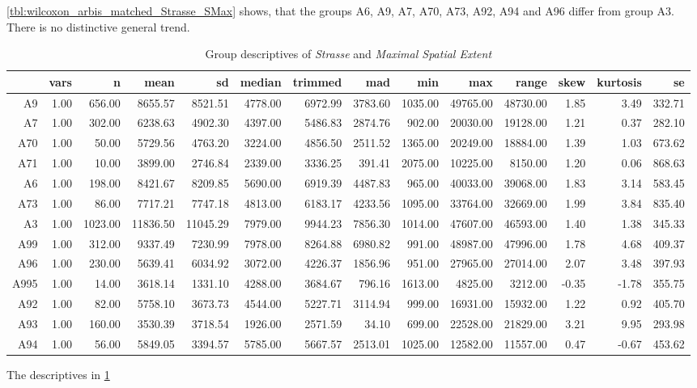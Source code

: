 \cref{tbl:wilcoxon_arbis_matched_Strasse_SMax} shows, that the groups A6, A9, A7, A70, A73, A92, A94 and A96 differ from group A3. There is no distinctive general trend.
\begin{table}[ht!]
	\tiny
	\centering
	\begin{tabular}{rrrrrrrrrrrrrr}
		\hline
		& vars & n & mean & sd & median & trimmed & mad & min & max & range & skew & kurtosis & se \\ 
		\hline
		A9   & 1.00 & 656.00 & 8655.57 & 8521.51 & 4778.00 & 6972.99 & 3783.60 & 1035.00 & 49765.00 & 48730.00 & 1.85 & 3.49 & 332.71 \\ 
		A7   & 1.00 & 302.00 & 6238.63 & 4902.30 & 4397.00 & 5486.83 & 2874.76 & 902.00 & 20030.00 & 19128.00 & 1.21 & 0.37 & 282.10 \\ 
		A70  & 1.00 & 50.00 & 5729.56 & 4763.20 & 3224.00 & 4856.50 & 2511.52 & 1365.00 & 20249.00 & 18884.00 & 1.39 & 1.03 & 673.62 \\ 
		A71  & 1.00 & 10.00 & 3899.00 & 2746.84 & 2339.00 & 3336.25 & 391.41 & 2075.00 & 10225.00 & 8150.00 & 1.20 & 0.06 & 868.63 \\ 
		A6   & 1.00 & 198.00 & 8421.67 & 8209.85 & 5690.00 & 6919.39 & 4487.83 & 965.00 & 40033.00 & 39068.00 & 1.83 & 3.14 & 583.45 \\ 
		A73  & 1.00 & 86.00 & 7717.21 & 7747.18 & 4813.00 & 6183.17 & 4233.56 & 1095.00 & 33764.00 & 32669.00 & 1.99 & 3.84 & 835.40 \\ 
		A3   & 1.00 & 1023.00 & 11836.50 & 11045.29 & 7979.00 & 9944.23 & 7856.30 & 1014.00 & 47607.00 & 46593.00 & 1.40 & 1.38 & 345.33 \\ 
		A99  & 1.00 & 312.00 & 9337.49 & 7230.99 & 7978.00 & 8264.88 & 6980.82 & 991.00 & 48987.00 & 47996.00 & 1.78 & 4.68 & 409.37 \\ 
		A96  & 1.00 & 230.00 & 5639.41 & 6034.92 & 3072.00 & 4226.37 & 1856.96 & 951.00 & 27965.00 & 27014.00 & 2.07 & 3.48 & 397.93 \\ 
		A995 & 1.00 & 14.00 & 3618.14 & 1331.10 & 4288.00 & 3684.67 & 796.16 & 1613.00 & 4825.00 & 3212.00 & -0.35 & -1.78 & 355.75 \\ 
		A92  & 1.00 & 82.00 & 5758.10 & 3673.73 & 4544.00 & 5227.71 & 3114.94 & 999.00 & 16931.00 & 15932.00 & 1.22 & 0.92 & 405.70 \\ 
		A93  & 1.00 & 160.00 & 3530.39 & 3718.54 & 1926.00 & 2571.59 & 34.10 & 699.00 & 22528.00 & 21829.00 & 3.21 & 9.95 & 293.98 \\ 
		A94  & 1.00 & 56.00 & 5849.05 & 3394.57 & 5785.00 & 5667.57 & 2513.01 & 1025.00 & 12582.00 & 11557.00 & 0.47 & -0.67 & 453.62 \\ 
		\bottomrule
	\end{tabular}
	\caption{Group descriptives of \textit{Strasse} and \textit{Maximal Spatial Extent}}
	\label{tbl:descriptives_arbis_matched_Strasse_SMax}
\end{table}
The descriptives in \cref{tbl:descriptives_arbis_matched_Strasse_SMax}

